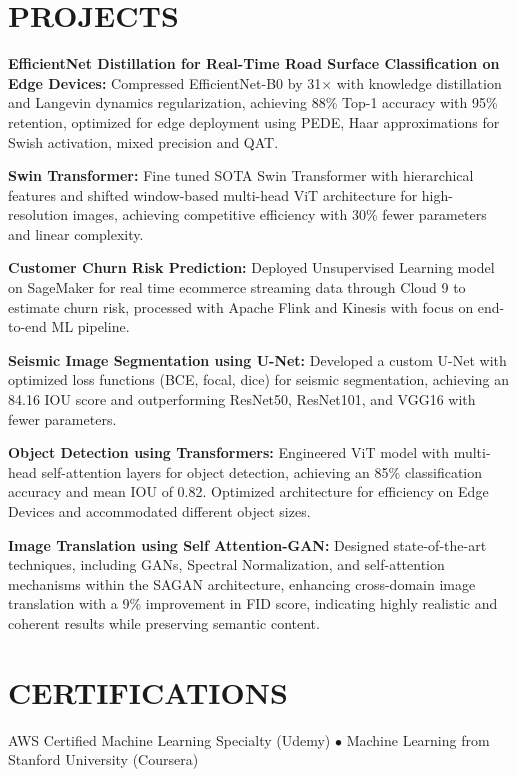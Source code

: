\documentclass[8pt,letterpaper]{article}
\begin{document}



\section{PROJECTS}
\textbf{EfficientNet Distillation for Real-Time Road Surface Classification on Edge Devices:} Compressed EfficientNet-B0 by 31× with knowledge distillation and Langevin dynamics regularization, achieving 88\% Top-1 accuracy with 95\% retention, optimized for edge deployment using PEDE, Haar approximations for Swish activation, mixed precision and QAT.

\textbf{Swin Transformer:} Fine tuned SOTA Swin Transformer with hierarchical features and shifted window-based multi-head ViT architecture for high-resolution images, achieving competitive efficiency with 30\% fewer parameters and linear complexity.

\textbf{Customer Churn Risk Prediction:} Deployed Unsupervised Learning model on SageMaker for real time ecommerce streaming data through Cloud 9 to estimate churn risk, processed with Apache Flink and Kinesis with focus on end-to-end ML pipeline.

\textbf{Seismic Image Segmentation using U-Net:} Developed a custom U-Net with optimized loss functions (BCE, focal, dice) for seismic segmentation, achieving an 84.16 IOU score and outperforming ResNet50, ResNet101, and VGG16 with fewer parameters.


\textbf{Object Detection using Transformers:} Engineered ViT model with multi-head self-attention layers for object detection, achieving an 85\% classification accuracy and mean IOU of 0.82. Optimized architecture for efficiency on Edge Devices and accommodated different object sizes.

\textbf{Image Translation using Self Attention-GAN:} Designed state-of-the-art techniques, including GANs, Spectral Normalization, and self-attention mechanisms within the SAGAN architecture, enhancing cross-domain image translation with a 9\% improvement in FID score, indicating highly realistic and coherent results while preserving semantic content.

\section{CERTIFICATIONS}
AWS Certified Machine Learning Specialty (Udemy) $\bullet$ Machine Learning from Stanford University (Coursera)
\end{document}
